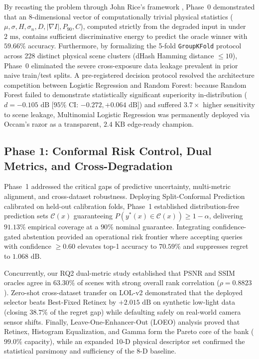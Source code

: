 \documentclass[journal]{IEEEtran}
\begin{document}
By recasting the problem through John Rice's framework \cite{rice1976algorithm}, Phase~0 demonstrated that an 8-dimensional vector of computationally trivial physical statistics ($\mu, \sigma, H, \sigma_n, D, |\nabla I|, P_{90}, C$), computed strictly from the degraded input in under $2\text{ ms}$, contains sufficient discriminative energy to predict the oracle winner with $59.66\%$ accuracy. Furthermore, by formalizing the 5-fold \texttt{GroupKFold} protocol across 228 distinct physical scene clusters (dHash Hamming distance $\le 10$), Phase~0 eliminated the severe cross-exposure data leakage prevalent in prior naive train/test splits. A pre-registered decision protocol resolved the architecture competition between Logistic Regression and Random Forest: because Random Forest failed to demonstrate statistically significant superiority in-distribution ($d = -0.105\text{ dB}$ [$95\%$ CI: $-0.272, +0.064\text{ dB}$]) and suffered $3.7\times$ higher sensitivity to scene leakage, Multinomial Logistic Regression was permanently deployed via Occam's razor as a transparent, $2.4\text{ KB}$ edge-ready champion.

\subsection{Phase 1: Conformal Risk Control, Dual Metrics, and Cross-Degradation}
Phase~1 addressed the critical gaps of predictive uncertainty, multi-metric alignment, and cross-dataset robustness. Deploying Split-Conformal Prediction calibrated on held-out calibration folds, Phase~1 established distribution-free prediction sets $\mathcal{C}(x)$ guaranteeing $P(y^*(x) \in \mathcal{C}(x)) \ge 1 - \alpha$, delivering $91.13\%$ empirical coverage at a $90\%$ nominal guarantee. Integrating confidence-gated abstention provided an operational risk frontier where accepting queries with confidence $\ge 0.60$ elevates top-1 accuracy to $70.59\%$ and suppresses regret to $1.068\text{ dB}$.

Concurrently, our RQ2 dual-metric study established that PSNR and SSIM oracles agree in $63.30\%$ of scenes with strong overall rank correlation ($\rho = 0.8823$). Zero-shot cross-dataset transfer on LOL-v2 demonstrated that the deployed selector beats Best-Fixed Retinex by $+2.015\text{ dB}$ on synthetic low-light data (closing $38.7\%$ of the regret gap) while defaulting safely on real-world camera sensor shifts. Finally, Leave-One-Enhancer-Out (LOEO) analysis proved that Retinex, Histogram Equalization, and Gamma form the Pareto core of the bank ($99.0\%$ capacity), while an expanded 10-D physical descriptor set confirmed the statistical parsimony and sufficiency of the 8-D baseline.
\end{document}
